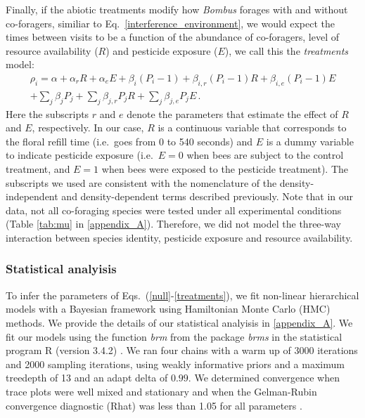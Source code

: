 \begin{refsection}
Finally, if the abiotic treatments modify how \textit{Bombus} forages with and without co-foragers, similiar to Eq.~\ref{interference_environment}, we would expect the times between visits to be a function of the abundance of co-foragers, level of resource availability ($R$) and pesticide exposure ($E$), we call this the \textit{treatments} model:
\begin{equation}
\begin{aligned}
\rho_{i} =\alpha + \alpha_{r} R+   \alpha_{e}E +  \beta_{i} (P_{i}-1) +  \beta_{i,r} (P_{i}-1) R +  \beta_{i,e} (P_{i}-1) E  \\      + \sum_{j}\beta_{j}P_{j}  +  \sum_{j}\beta_{j,r}P_{j}R +  \sum_{j}\beta_{j,e}P_{j}  E \,.
\end{aligned}
\label{treatments}
\end{equation}
Here the subscripts  $r$ and $e$ denote the parameters that estimate the effect of $R$ and $E$, respectively. In our case, $R$ is a continuous variable that corresponds to the floral refill time (i.e.\ goes from 0 to 540 seconds) and $E$ is a dummy variable to indicate pesticide exposure (i.e.\ $E = 0$ when bees are subject to the control treatment, and $E=1$ when bees were exposed to the pesticide treatment). The subscripts we used are consistent with the nomenclature of the density-independent and density-dependent terms described previously. Note that in our data, not all co-foraging species were tested under all experimental conditions (Table \ref{tab:mu} in \autoref{appendix_A}). Therefore, we did not model the three-way interaction between species identity, pesticide exposure and resource availability.


\subsubsection*{Statistical analyisis}

To  infer the parameters of Eqs.~(\ref{null}-\ref{treatments}), we fit non-linear hierarchical models with a Bayesian framework using Hamiltonian Monte Carlo (HMC) methods. We provide the details of our statistical analyisis in \autoref{appendix_A}. We fit our  models using the function  \textit{brm} from the package \textit{brms} \citep{burkner_advanced_2017} in the statistical program \textsc{R} (version 3.4.2) \citep{Rcore}. We ran four chains with a warm up of 3000 iterations and 2000 sampling iterations, using weakly informative priors and a maximum treedepth of 13 and an adapt delta of $0.99$. We determined convergence when trace plots were well mixed and stationary and when the Gelman-Rubin convergence diagnostic (Rhat) was less than 1.05 for all parameters \citep{vehtari_rank-normalization_2020}.


\end{refsection}
